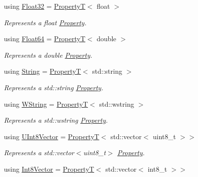 \begin{DoxyCompactItemize}
using \hyperlink{group___process_properties_ga510dd39bb8449946d6317469973644c9}{Float32} = \hyperlink{structdg_1_1deepcore_1_1_property_t}{PropertyT}$<$ float $>$
\begin{DoxyCompactList}\small\item\em Represents a {\ttfamily float} \hyperlink{classdg_1_1deepcore_1_1_property}{Property}. \end{DoxyCompactList}\item 
using \hyperlink{group___process_properties_ga9c03a5a68945303265f5ab945f2bfa2a}{Float64} = \hyperlink{structdg_1_1deepcore_1_1_property_t}{PropertyT}$<$ double $>$
\begin{DoxyCompactList}\small\item\em Represents a {\ttfamily double} \hyperlink{classdg_1_1deepcore_1_1_property}{Property}. \end{DoxyCompactList}\item 
using \hyperlink{group___process_properties_ga4e7e285652391b247ecc3a1487d234e6}{String} = \hyperlink{structdg_1_1deepcore_1_1_property_t}{PropertyT}$<$ std\+::string $>$
\begin{DoxyCompactList}\small\item\em Represents a {\ttfamily std\+::string} \hyperlink{classdg_1_1deepcore_1_1_property}{Property}. \end{DoxyCompactList}\item 
using \hyperlink{group___process_properties_gaf9c2048c12577553d955c02ce1247d2b}{W\+String} = \hyperlink{structdg_1_1deepcore_1_1_property_t}{PropertyT}$<$ std\+::wstring $>$
\begin{DoxyCompactList}\small\item\em Represents a {\ttfamily std\+::wstring} \hyperlink{classdg_1_1deepcore_1_1_property}{Property}. \end{DoxyCompactList}\item 
using \hyperlink{group___process_properties_ga07c09eb3d6ee78c35a8e4d9e846adbb6}{U\+Int8\+Vector} = \hyperlink{structdg_1_1deepcore_1_1_property_t}{PropertyT}$<$ std\+::vector$<$ uint8\+\_\+t $>$$>$
\begin{DoxyCompactList}\small\item\em Represents a {\ttfamily std\+::vector$<$uint8\+\_\+t$>$} \hyperlink{classdg_1_1deepcore_1_1_property}{Property}. \end{DoxyCompactList}\item 
using \hyperlink{group___process_properties_ga4992e9dee24d17c26fa3e61ed758cdfd}{Int8\+Vector} = \hyperlink{structdg_1_1deepcore_1_1_property_t}{PropertyT}$<$ std\+::vector$<$ int8\+\_\+t $>$$>$

\end{DoxyCompactItemize}
